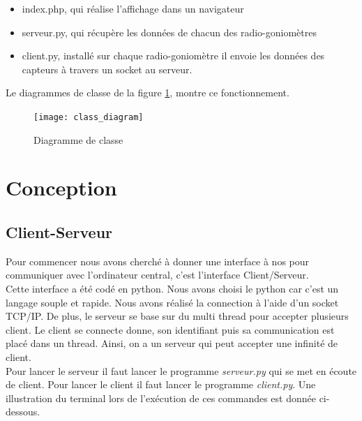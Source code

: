 \begin{itemize}
\item index.php, qui réalise l'affichage dans un navigateur
\item serveur.py, qui récupère les données de chacun des radio-goniomètres
\item client.py, installé sur chaque radio-goniomètre il envoie les données des capteurs à travers un socket au serveur.
\end{itemize}

Le diagrammes de classe de la figure \ref{fig:class}, montre ce fonctionnement.

\begin{figure}[!h]
  \centering
  \texttt{[image: class\_diagram]}
  \caption{Diagramme de classe}
  \label{fig:class}
\end{figure}



\section{Conception}

\subsection{Client-Serveur}

Pour commencer nous avons cherché à donner une interface à nos \rpi pour communiquer avec l'ordinateur central, c'est l'interface Client/Serveur.
~\\

Cette interface a été codé en python. Nous avons choisi le python car c'est un langage souple et rapide. Nous avons réalisé la connection à l'aide d'un socket TCP/IP. De plus, le serveur se base sur du multi thread pour accepter plusieurs client. Le client se connecte donne, son identifiant puis sa communication est placé dans un thread. Ainsi, on a un serveur qui peut accepter une infinité de client.
~\\

Pour lancer le serveur il faut lancer le programme \textit{serveur.py} qui se met en écoute de client. Pour lancer le client il faut lancer le programme \textit{client.py}. Une illustration du terminal lors de l'exécution de ces commandes est donnée ci-dessous.
~\\

